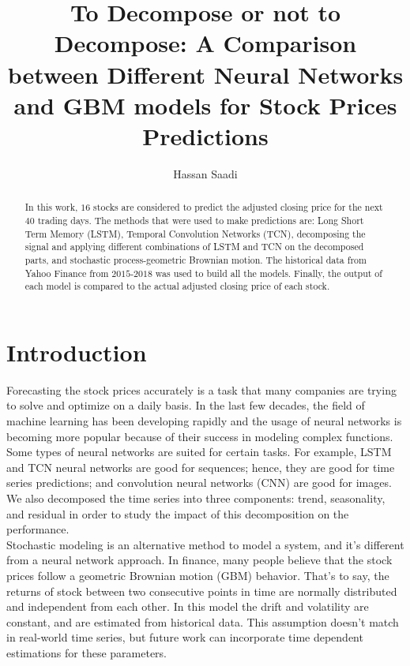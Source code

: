 \documentclass[12pt, A4]{article}
\title{To Decompose or not to Decompose: A Comparison between Different Neural Networks and GBM models for Stock Prices Predictions}
\author{Hassan Saadi}
\begin{document}
	\date{}
	\maketitle
\begin{abstract}
	In this work, $16$ stocks are considered to predict the adjusted closing price for the next $40$ trading days. The methods that were used to make predictions are: Long Short Term Memory (LSTM), Temporal Convolution Networks (TCN), decomposing the signal and applying different combinations of LSTM and TCN on the decomposed parts, and stochastic process-geometric Brownian motion. The historical data from Yahoo Finance from $2015$-$2018$ was used to build all the models. Finally, the output of each model is compared to the actual adjusted closing price of each stock. 

\end{abstract}

\section{Introduction}
Forecasting the stock prices accurately is a task that many companies are trying to solve and optimize on a daily basis. In the last few decades, the field of machine learning has been developing rapidly and the usage of neural networks is becoming more popular because of their success in modeling complex functions. Some types of neural networks are suited for certain tasks. For example, LSTM and TCN neural networks are good for sequences; hence, they are good for time series predictions; and convolution neural networks (CNN) are good for images. We also decomposed the time series into three components: trend, seasonality, and residual in order to study the impact of this decomposition on the performance.  \\

Stochastic modeling is an alternative method to model a system, and it's different from a neural network approach. In finance, many people believe that the stock prices follow a geometric Brownian motion (GBM) behavior. That's to say, the returns of stock between two consecutive points in time are normally distributed and independent from each other. In this model the drift and volatility are constant, and are estimated from historical data. This assumption doesn't match in real-world time series, but future work can incorporate time dependent estimations for these parameters.\\
\end{document}
